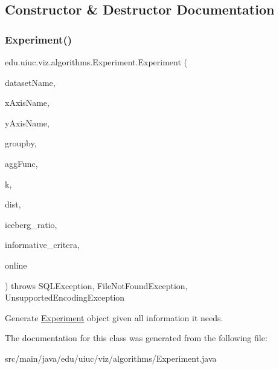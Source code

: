 \subsection{Constructor \& Destructor Documentation}
\mbox{\label{classedu_1_1uiuc_1_1viz_1_1algorithms_1_1_experiment_a6e1595f762646d6ae4576f8dd8825120}} 
\subsubsection{\texorpdfstring{Experiment()}{Experiment()}}
{\footnotesize\ttfamily edu.\+uiuc.\+viz.\+algorithms.\+Experiment.\+Experiment (\begin{DoxyParamCaption}\item[{String}]{dataset\+Name,  }\item[{String}]{x\+Axis\+Name,  }\item[{String}]{y\+Axis\+Name,  }\item[{Array\+List$<$ String $>$}]{groupby,  }\item[{String}]{agg\+Func,  }\item[{int}]{k,  }\item[{\mbox{\hyperlink{interfaceedu_1_1uiuc_1_1viz_1_1distance_1_1_distance}{Distance}}}]{dist,  }\item[{double}]{iceberg\+\_\+ratio,  }\item[{double}]{informative\+\_\+critera,  }\item[{boolean}]{online }\end{DoxyParamCaption}) throws S\+Q\+L\+Exception, File\+Not\+Found\+Exception, Unsupported\+Encoding\+Exception}

Generate \mbox{\hyperlink{classedu_1_1uiuc_1_1viz_1_1algorithms_1_1_experiment}{Experiment}} object given all information it needs. 

The documentation for this class was generated from the following file\+:\begin{DoxyCompactItemize}
\item 
src/main/java/edu/uiuc/viz/algorithms/Experiment.\+java\end{DoxyCompactItemize}
